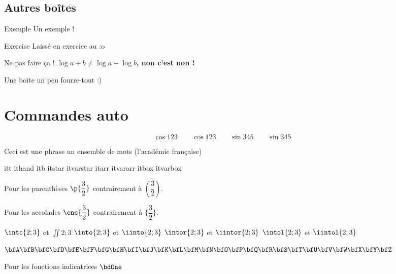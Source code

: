 \documentclass[a4paper,french,bookmarks]{article}
\begin{document}
    \subsection{Autres boîtes}
    
    \begin{example}{Exemple}{}
        Un exemple  !
    \end{example}
    
    \begin{exercise}{Exercise}{}
        Laissé en exercice au  :o
    \end{exercise}
    
    \begin{warning}{Ne pas faire ça !}{}
        \bf{$\log{a + b} \neq \log{a} + \log{b}$}, non c'est non !
    \end{warning}
    
    \begin{form}{Une boite un peu fourre-tout}{}
         :)
    \end{form}
    
    \section{Commandes auto}
    
    \[ \cos{123} \qquad \cos 123 \qquad \sin{345} \qquad \sin 345 \]
    
    Ceci est une phrase \ie un ensemble de mots (\cf l'académie française)
    
    \begin{enumerate}
        \itt itt
        \ithand ithand
        \itb itb
        \itstar itstar
        \itvarstar itvarstar
        \itarr itarr
        \itvararr itvararr
        \itbox itbox
        \itvarbox itvarbox
    \end{enumerate}
    
    Pour les parenthèses $\p{\dfrac{3}{2}}$ contrairement à $(\dfrac{3}{2})$.
    
    Pour les accolades $\ens{\dfrac{3}{2}}$ contrairement à $\{\dfrac{3}{2}\}$.
    
    \begin{enumerate}
        \itt $\intc{2; 3}$ et  $\iint{2; 3}$
        \itt $\into{2; 3}$ et  $\iinto{2; 3}$
        \itt $\intor{2; 3}$ et  $\iintor{2; 3}$
        \itt $\intol{2; 3}$ et  $\iintol{2; 3}$
    \end{enumerate}
    
    $\bfA \bfB \bfC \bfD \bfE \bfF \bfG \bfH \bfI \bfJ \bfK \bfL \bfM \bfN \bfO \bfP \bfQ \bfR \bfS \bfT \bfU \bfV \bfW \bfX \bfY \bfZ$
    
    Pour les fonctions indicatrices $\bdOne$
\end{document}
